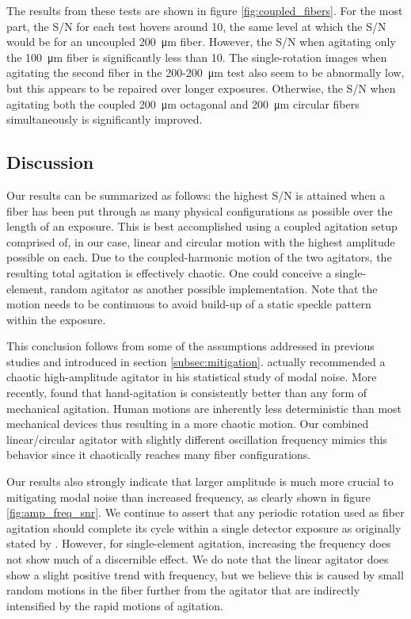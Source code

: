 \documentclass[twocolumn]{emulateapj}
\begin{document}
The results from these tests are shown in figure \ref{fig:coupled_fibers}. For the most part, the S/N for each test hovers around 10, the same level at which the S/N would be for an uncoupled \SI{200}{\micro\meter} fiber. However, the S/N when agitating only the \SI{100}{\micro\meter} fiber is significantly less than 10. The single-rotation images when agitating the second fiber in the 200-\SI{200}{\micro\meter} test also seem to be abnormally low, but this appears to be repaired over longer exposures. Otherwise, the S/N when agitating both the coupled \SI{200}{\micro\meter} octagonal and \SI{200}{\micro\meter} circular fibers simultaneously is significantly improved.

\subsection{Discussion}
\label{subsec:discussion}

Our results can be summarized as follows: the highest S/N is attained when a fiber has been put through as many physical configurations as possible over the length of an exposure. This is best accomplished using a coupled agitation setup comprised of, in our case, linear and circular motion with the highest amplitude possible on each. Due to the coupled-harmonic motion of the two agitators, the resulting total agitation is effectively chaotic. One could conceive a single-element, random agitator as another possible implementation. Note that the motion needs to be continuous to avoid build-up of a static speckle pattern within the exposure.

This conclusion follows from some of the assumptions addressed in previous studies and introduced in section \ref{subsec:mitigation}. \citet{Grupp2003} actually recommended a chaotic high-amplitude agitator in his statistical study of modal noise. More recently, \citet{Lemke2011, McCoy2012, Mahadevan2014, Roy2014} found that hand-agitation is consistently better than any form of mechanical agitation. Human motions are inherently less deterministic than most mechanical devices thus resulting in a more chaotic motion. Our combined linear/circular agitator with slightly different oscillation frequency mimics this behavior since it chaotically reaches many fiber configurations.

Our results also strongly indicate that larger amplitude is much more crucial to mitigating modal noise than increased frequency, as clearly shown in figure \ref{fig:amp_freq_snr}. We continue to assert that any periodic rotation used as fiber agitation should complete its cycle within a single detector exposure as originally stated by \citet{Baudrand2001}. However, for single-element agitation, increasing the frequency does not show much of a discernible effect. We do note that the linear agitator does show a slight positive trend with frequency, but we believe this is caused by small random motions in the fiber further from the agitator that are indirectly intensified by the rapid motions of agitation.
\end{document}
